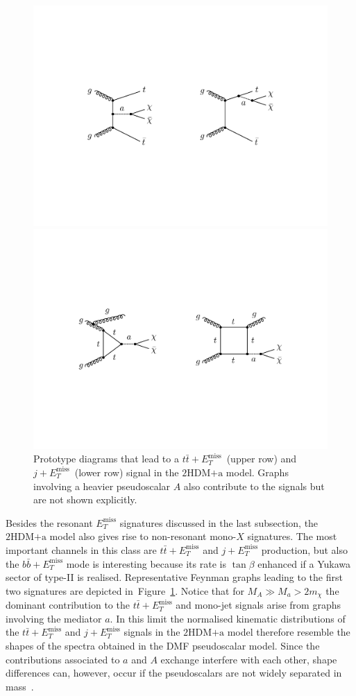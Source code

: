\documentclass[a4paper, 11pt,notoc]{article}
\newcommand{\MET}{\ensuremath{E_T^\mathrm{miss}}\xspace}
\newcommand{\hdma}{\ensuremath{\textrm{2HDM+a}}\xspace}
\begin{document}
\begin{figure}[t!]
\centering
\includegraphics[width=.725\textwidth]{ttmet.pdf}

\vspace{7mm}

\includegraphics[width=.8\textwidth]{jmet.pdf}

\vspace{4mm}
\caption{\label{fig:nonresonant} Prototype diagrams that lead  to a $t \bar t+\MET$~(upper row) and $j+\MET$~(lower row) signal in the \hdma model. Graphs involving a heavier pseudoscalar $A$ also contribute to the signals but are not shown explicitly.}
\end{figure}

Besides the resonant $\MET$ signatures discussed in the last subsection, the   \hdma model also gives rise to non-resonant mono-$X$ signatures. The most important channels in this class are $t \bar t +\MET$ and $j+\MET$ production, but also  the $b \bar b +\MET$ mode is interesting  because its rate is $\tan \beta$ enhanced if a Yukawa sector of  type-II is realised.  Representative Feynman graphs leading to the first two signatures are depicted in~Figure~\ref{fig:nonresonant}. Notice that for $M_A \gg M_a > 2 m_\chi$ the dominant contribution to the  $t \bar t +\MET$ and mono-jet signals arise from graphs involving the  mediator $a$. In this limit the normalised kinematic distributions of the $t \bar t + \MET$ and $j+\MET$ signals in the \hdma model therefore resemble the shapes of the spectra obtained in the DMF pseudoscalar   model. Since the contributions  associated to $a$ and $A$ exchange interfere with each other, shape differences can, however, occur if the pseudoscalars are not widely separated in mass~\cite{Bauer:2017ota}.
\end{document}
